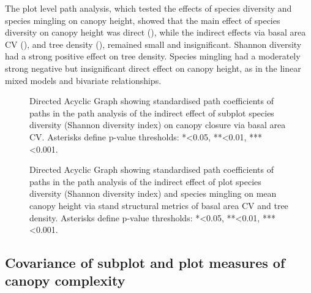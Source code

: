 \begin{refsection}
The plot level path analysis, which tested the effects of species diversity and species mingling on canopy height, showed that the main effect of species diversity on canopy height was direct (\treeShannonHeightPath{}), while the indirect effects via basal area CV (\treeShannonBaHeightPath{}), and tree density (\treeShannonDensHeightPath{}), remained small and insignificant. Shannon diversity had a strong positive effect on tree density. Species mingling had a moderately strong negative but insignificant direct effect on canopy height, as in the linear mixed models and bivariate relationships.

\begin{figure}
	
	\caption[Path coefficients for subplot canopy closure path analysis]{Directed Acyclic Graph showing standardised path coefficients of paths in the path analysis of the indirect effect of subplot species diversity (Shannon diversity index) on canopy closure via basal area CV. Asterisks define p-value thresholds: *<0.05, **<0.01, ***<0.001.}
	\label{tls:path_diag_cover}
\end{figure}

\begin{figure}
	
	\caption[Path coefficients for plot canopy height path analysis]{Directed Acyclic Graph showing standardised path coefficients of paths in the path analysis of the indirect effect of plot species diversity (Shannon diversity index) and species mingling on mean canopy height via stand structural metrics of basal area CV and tree density. Asterisks define p-value thresholds: *<0.05, **<0.01, ***<0.001.}
	\label{tls:path_diag_height}
\end{figure}

\subsection{Covariance of subplot and plot measures of canopy complexity}
\label{tls:ssec:covariance}


\end{refsection}
